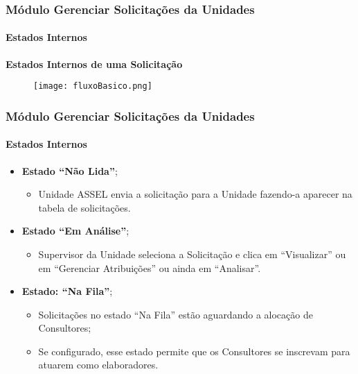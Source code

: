 \begin{frame}
	\frametitle{Módulo Gerenciar Solicitações da Unidades}
	\framesubtitle{Estados Internos}

	\textbf{Estados Internos de uma Solicitação}

	\begin{figure}
		\texttt{[image: fluxoBasico.png]}
	\end{figure}
\end{frame}


\begin{frame}
	\frametitle{Módulo Gerenciar Solicitações da Unidades}
	\framesubtitle{Estados Internos}
	\begin{itemize}
		\item \textbf{Estado ``Não Lida''};
		\begin{itemize}
			\item Unidade ASSEL envia a solicitação para a Unidade fazendo-a aparecer na tabela de solicitações.
		\end{itemize}
	
		\item \textbf{Estado ``Em Análise''};
		\begin{itemize}
			\item Supervisor da Unidade seleciona a Solicitação e clica em ``Visualizar'' ou em ``Gerenciar Atribuições'' ou ainda em ``Analisar''.
		\end{itemize}
	
		\item \textbf{Estado: ``Na Fila''};
		\begin{itemize}
			\item Solicitações no estado ``Na Fila'' estão aguardando a alocação de Consultores;

			\item Se configurado, esse estado permite que os Consultores se inscrevam para atuarem como elaboradores.			
		\end{itemize}
	\end{itemize}
\end{frame}


